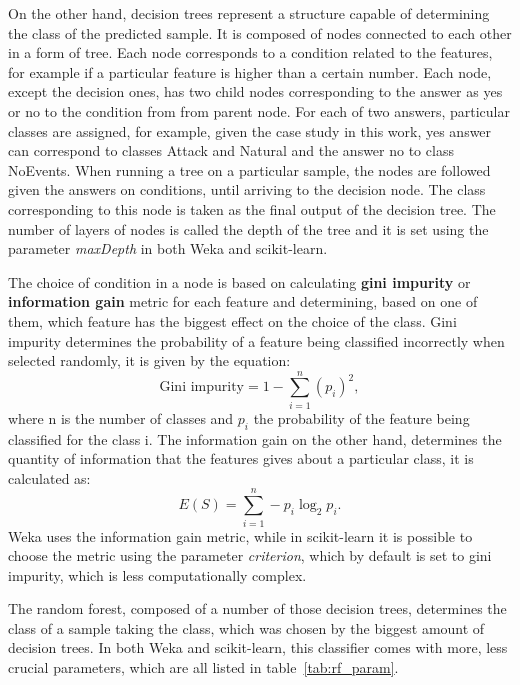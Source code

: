 On the other hand, decision trees represent a structure capable of determining the class of the predicted sample. It is composed of nodes connected to each other in a form of tree. Each node corresponds to a condition related to the features, for example if a particular feature is higher than a certain number. Each node, except the decision ones, has two child nodes corresponding to the answer as yes or no to the condition from from parent node. For each of two answers, particular classes are assigned, for example, given the case study in this work, yes answer can correspond to classes Attack and Natural and the answer no to class NoEvents. When running a tree on a particular sample, the nodes are followed given the answers on conditions, until arriving to the decision node. The class corresponding to this node is taken as the final output of the decision tree. The number of layers of nodes is called the depth of the tree and it is set using the parameter \textit{maxDepth} in both Weka and scikit-learn.

The choice of condition in a node is based on calculating \textbf{gini impurity} or \textbf{information gain} metric for each feature and determining, based on one of them, which feature has the biggest effect on the choice of the class. Gini impurity determines the probability of a feature being classified incorrectly when selected randomly, it is given by the equation:
\begin{equation}
    \text{Gini impurity} = 1 - \sum^n_{i=1} (p_i)^2,
\end{equation}
where n is the number of classes and $p_i$ the probability of the feature being classified for the class i. The information gain on the other hand, determines the quantity of information that the features gives about a particular class, it is calculated as:
\begin{equation}
    E(S) = \sum^n_{i=1} - p_i \log_2 p_i.
\end{equation}
Weka uses the information gain metric, while in scikit-learn it is possible to choose the metric using the parameter \textit{criterion}, which by default is set to gini impurity, which is less computationally complex.

The random forest, composed of a number of those decision trees, determines the class of a sample taking the class, which was chosen by the biggest amount of decision trees. In both Weka and scikit-learn, this classifier comes with more, less crucial parameters, which are all listed in table~\ref{tab:rf_param}.

